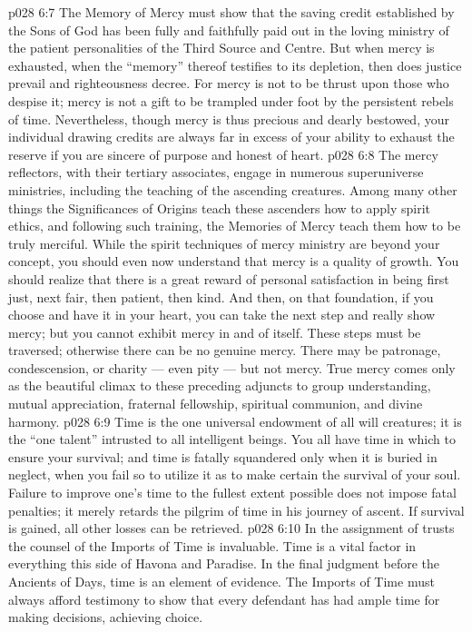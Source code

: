 \vs p028 6:7 The Memory of Mercy must show that the saving credit established by the Sons of God has been fully and faithfully paid out in the loving ministry of the patient personalities of the Third Source and Centre. But when mercy is exhausted, when the “memory” thereof testifies to its depletion, then does justice prevail and righteousness decree. For mercy is not to be thrust upon those who despise it; mercy is not a gift to be trampled under foot by the persistent rebels of time. Nevertheless, though mercy is thus precious and dearly bestowed, your individual drawing credits are always far in excess of your ability to exhaust the reserve if you are sincere of purpose and honest of heart.
\vs p028 6:8 \pc The mercy reflectors, with their tertiary associates, engage in numerous superuniverse ministries, including the teaching of the ascending creatures. Among many other things the Significances of Origins teach these ascenders how to apply spirit ethics, and following such training, the Memories of Mercy teach them how to be truly merciful. While the spirit techniques of mercy ministry are beyond your concept, you should even now understand that mercy is a quality of growth. You should realize that there is a great reward of personal satisfaction in being first just, next fair, then patient, then kind. And then, on that foundation, if you choose and have it in your heart, you can take the next step and really show mercy; but you cannot exhibit mercy in and of itself. These steps must be traversed; otherwise there can be no genuine mercy. There may be patronage, condescension, or charity --- even pity --- but not mercy. True mercy comes only as the beautiful climax to these preceding adjuncts to group understanding, mutual appreciation, fraternal fellowship, spiritual communion, and divine harmony.
\vs p028 6:9 \bibnobreakspace {} Time is the one universal endowment of all will creatures; it is the “one talent” intrusted to all intelligent beings. You all have time in which to ensure your survival; and time is fatally squandered only when it is buried in neglect, when you fail so to utilize it as to make certain the survival of your soul. Failure to improve one’s time to the fullest extent possible does not impose fatal penalties; it merely retards the pilgrim of time in his journey of ascent. If survival is gained, all other losses can be retrieved.
\vs p028 6:10 In the assignment of trusts the counsel of the Imports of Time is invaluable. Time is a vital factor in everything this side of Havona and Paradise. In the final judgment before the Ancients of Days, time is an element of evidence. The Imports of Time must always afford testimony to show that every defendant has had ample time for making decisions, achieving choice.
